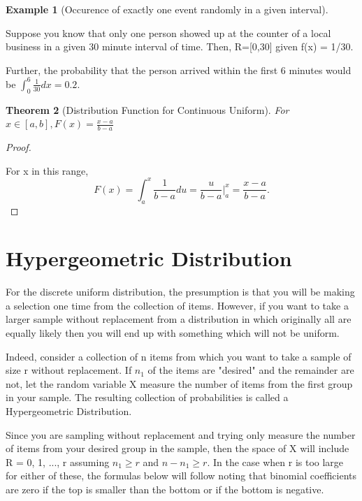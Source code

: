 \documentclass[10pt,]{book}
\theoremstyle{plain}
\newtheorem{theorem}{Theorem}[section]
\theoremstyle{definition}
\theoremstyle{definition}
\newtheorem{example}[theorem]{Example}
\theoremstyle{definition}
\numberwithin{equation}{section}
\begin{document}
\begin{example}[Occurence of exactly one event randomly in a given interval]\label{example-21}

Suppose you know that only one person showed up at the counter of a local business in a given 30 minute interval of time. Then, R=[0,30] given f(x) = 1/30.
%
\par

Further, the probability that the person arrived within the first 6 minutes would be \(\int_0^6 \frac{1}{30} dx = 0.2\).
%
\end{example}
\begin{theorem}[{Distribution Function for Continuous Uniform}]\label{theorem-35}
 For \(x \in [a,b], F(x) = \frac{x-a}{b-a}\)\end{theorem}
\begin{proof}\hypertarget{proof-32}{}

For x in this range, 
\begin{equation*}F(x) = \int_a^x \frac{1}{b-a} du = \frac{u}{b-a} \big |_a^x = \frac{x-a}{b-a}.\end{equation*}
%
\end{proof}
\typeout{************************************************}
\typeout{************************************************}
\section[{Hypergeometric Distribution}]{Hypergeometric Distribution}\label{section-28}

	For the discrete uniform distribution, the presumption is that you will be making a selection one time from the collection of items. However, if you want to take a larger sample without replacement from a distribution in which originally all are equally likely then you will end up with something which will not be uniform.%
\par

	Indeed, consider a collection of n items from which you want to take a sample of size r without replacement. If \(n_1\) of the items are "desired" and the remainder are not, let the random variable X measure the number of items from the first group in your sample. The resulting collection of probabilities is called a Hypergeometric Distribution.
\par

	Since you are sampling without replacement and trying only measure the number of items from your desired group in the sample, then the space of X will include R = {0, 1, ..., r} assuming \(n_1 \ge r\) and \(n-n_1 \ge r\). In the case when r is too large for either of these, the formulas below will follow noting that binomial coefficients are zero if the top is smaller than the bottom or if the bottom is negative.
\par
\end{document}

